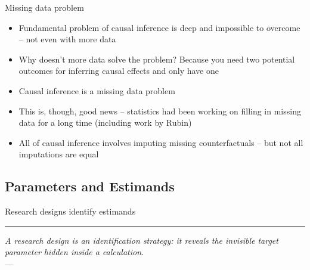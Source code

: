 \documentclass{beamer}
\newcommand{\pullquote}[2]{%
  \begin{flushleft}
    {\color{accent}\rule{0.4em}{2.5em}}\hspace{0.6em}%
    \begin{minipage}[c]{0.85\textwidth}
      {\color{charcoal}\itshape\large #1}%
      \ifx\relax#2\relax\else\\[0.3em]{\color{warmgray}\small --- #2}\fi
    \end{minipage}
  \end{flushleft}
}
\begin{document}
\begin{frame}{Missing data problem}


    
    \begin{itemize}
    \item Fundamental problem of causal inference is deep and impossible to overcome -- not even with more data 
    \item Why doesn't more data solve the problem? Because you need two potential outcomes for inferring causal effects and only have one
    \item Causal inference is a missing data problem 
    \item This is, though, good news -- statistics had been working on filling in missing data for a long time (including work by Rubin)
    \item All of causal inference involves imputing missing counterfactuals -- but not all imputations are equal
  \end{itemize}

    
\end{frame}


\subsection{Parameters and Estimands}


\begin{frame}{Research designs identify estimands}
\vspace{0.4em}
\pullquote{A research design is an identification strategy: it reveals the invisible target parameter hidden inside a calculation.}{}
\vspace{1.2em}
\begin{center}
\end{center}
\end{frame}
\end{document}
